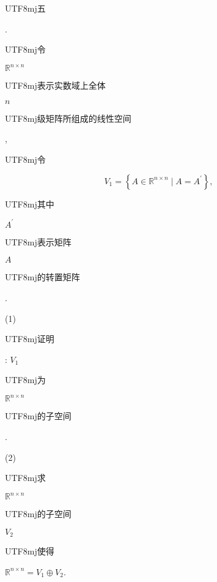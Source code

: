 \documentclass[10pt]{article}
\begin{document}
\begin{CJK}{UTF8}{mj}五\end{CJK}. \begin{CJK}{UTF8}{mj}令\end{CJK} $\mathbb{R}^{n \times n}$ \begin{CJK}{UTF8}{mj}表示实数域上全体\end{CJK} $n$ \begin{CJK}{UTF8}{mj}级矩阵所组成的线性空间\end{CJK}, \begin{CJK}{UTF8}{mj}令\end{CJK}
$$
V_{1}=\left\{A \in \mathbb{R}^{n \times n} \mid A=A^{\prime}\right\},
$$
\begin{CJK}{UTF8}{mj}其中\end{CJK} $A^{\prime}$ \begin{CJK}{UTF8}{mj}表示矩阵\end{CJK} $A$ \begin{CJK}{UTF8}{mj}的转置矩阵\end{CJK}.

(1) \begin{CJK}{UTF8}{mj}证明\end{CJK}: $V_{1}$ \begin{CJK}{UTF8}{mj}为\end{CJK} $\mathbb{R}^{n \times n}$ \begin{CJK}{UTF8}{mj}的子空间\end{CJK}.

(2) \begin{CJK}{UTF8}{mj}求\end{CJK} $\mathbb{R}^{n \times n}$ \begin{CJK}{UTF8}{mj}的子空间\end{CJK} $V_{2}$ \begin{CJK}{UTF8}{mj}使得\end{CJK} $\mathbb{R}^{n \times n}=V_{1} \oplus V_{2}$.
\end{document}
